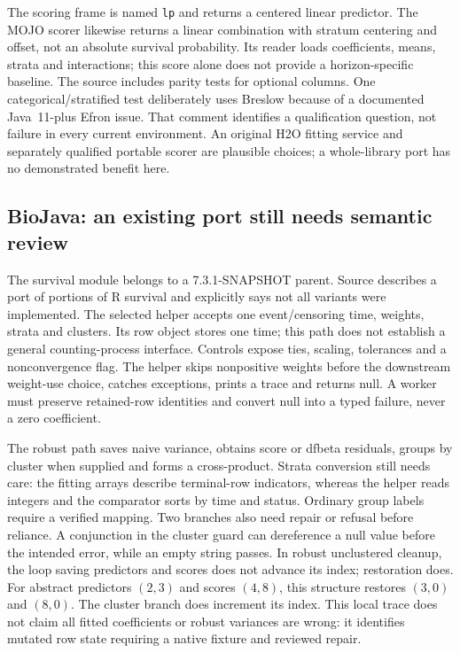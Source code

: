 The scoring frame is named \texttt{lp} and returns a centered linear
predictor. The MOJO scorer likewise returns a linear combination with
stratum centering and offset, not an absolute survival probability. Its
reader loads coefficients, means, strata and interactions; this score alone
does not provide a horizon-specific baseline. The source includes parity
tests for optional columns. One categorical/stratified test deliberately uses
Breslow because of a documented Java~11-plus Efron issue. That comment
identifies a qualification question, not failure in every current environment.
An original H2O fitting service and separately qualified portable scorer are
plausible choices; a whole-library port has no demonstrated benefit here.
\citep{exec24_longjava_h2o}

\subsection{BioJava: an existing port still needs semantic review}
The survival module belongs to a 7.3.1-SNAPSHOT parent. Source describes a
port of portions of R survival and explicitly says not all variants were
implemented. The selected helper accepts one event/censoring time, weights,
strata and clusters. Its row object stores one time; this path does not
establish a general counting-process interface. Controls expose ties,
scaling, tolerances and a nonconvergence flag. The helper skips nonpositive
weights before the downstream weight-use choice, catches exceptions, prints
a trace and returns null. A worker must preserve retained-row identities
and convert null into a typed failure, never a zero coefficient.
\citep{exec24_longjava_biojava}

The robust path saves naive variance, obtains score or dfbeta residuals,
groups by cluster when supplied and forms a cross-product. Strata conversion
still needs care: the fitting arrays describe terminal-row indicators,
whereas the helper reads integers and the comparator sorts by time and status.
Ordinary group labels require a verified mapping. Two branches also need
repair or refusal before reliance. A conjunction in the cluster guard can
dereference a null value before the intended error, while an empty string
passes. In robust unclustered cleanup, the loop saving predictors and scores
does not advance its index; restoration does. For abstract predictors $(2,3)$
and scores $(4,8)$, this structure restores $(3,0)$ and $(8,0)$. The cluster
branch does increment its index. This local trace does not claim all fitted
coefficients or robust variances are wrong: it identifies mutated row state
requiring a native fixture and reviewed repair.
\citep{exec24_longjava_biojava,exec24_longjava_reference}

